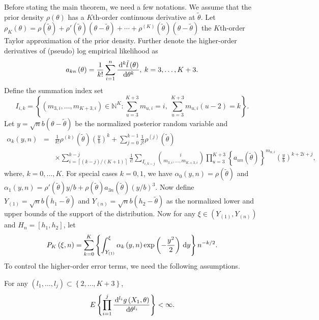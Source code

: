 Before stating the main theorem, we need a few notations. We assume that the
prior density $\rho\left(\theta\right)$ has a $K$th-order continuous derivative
at $\tilde{\theta}$. Let $\rho_{K}\left(\theta\right)=\rho\left(\tilde{\theta}\right)+\rho'\left(\tilde{\theta}\right)\left(\theta-\tilde{\theta}\right)+\cdots+\rho^{\left(K\right)}\left(\tilde{\theta}\right)\left(\theta-\tilde{\theta}\right)$ the $K$th-order  Taylor approximation of the prior density.
Further denote the higher-order derivatives of (pseudo) log empirical
likelihood as 
\[
a_{kn}\left(\theta\right)=\frac{1}{k!}\sum_{i=1}^{n}\frac{\,\mathrm{d}^{k}\tilde{l}\left(\theta\right)}{\,\mathrm{d}\theta^{k}},\: k=3,\ldots,K+3.
\]
 Define the summation index set 
\[
I_{i,k}=\left\{ \left(m_{3,i},\ldots,m_{K+3,i}\right)\in\mathbb{N}^{K}:\sum_{u=3}^{K+3}m_{u,i}=i,\:\sum_{u=3}^{K+3}m_{u,i}\left(u-2\right)=k\right\} .
\]
 Let $y=\sqrt{n}b\left(\theta-\tilde{\theta}\right)$ be the normalized posterior random variable and 
\begin{eqnarray*}
\alpha_{k}\left(y,n\right) & = & \frac{1}{k!}\rho^{\left(k\right)}\left(\tilde{\theta}\right)\left(\frac{y}{b}\right)^{k}+\sum_{j=0}^{k-1}\frac{1}{j!}\rho^{\left(j\right)}\left(\tilde{\theta}\right)\\
 &  & \times\sum_{i=\left\lceil \left(k-j\right)/\left(K+1\right)\right\rceil }^{k-j}\frac{1}{i!}\sum_{I_{i,k-j}}\binom{i}{m_{3,i},\ldots,m_{K+3,i}}\prod_{u=3}^{K+3}\left\{ a_{un}\left(\tilde{\theta}\right)\right\} ^{m_{u,i}}\left(\frac{y}{b}\right)^{k+2i+j},
\end{eqnarray*}
where, $k=0,\ldots,K$. For special cases $k=0,1$, we have $\alpha_{0}\left(y,n\right)=\rho\left(\tilde{\theta}\right)$
and $\alpha_{1}\left(y,n\right)=\rho'\left(\tilde{\theta}\right)y/b+\rho\left(\tilde{\theta}\right)a_{3n}\left(\tilde{\theta}\right)\left(y/b\right)^{3}.$
Now define $Y_{\left(1\right)}=\sqrt{n}b\left(h_{1}-\tilde{\theta}\right)$
and $Y_{\left(n\right)}=\sqrt{n}b\left(h_{2}-\tilde{\theta}\right)$  as  the normalized lower and upper bounds of the support of the  distribution. Now for any $\xi\in\left(Y_{\left(1\right)},Y_{\left(n\right)}\right)$ 
and $H_n=\left[h_{1},h_{2}\right]$, {let }
\[
P_{K}\left(\xi,n\right)=\sum_{k=0}^{K}\left\{ \int_{Y_{\left(1\right)}}^{\xi}\alpha_{k}\left(y,n\right)\exp\left(-\frac{y^{2}}{2}\right)\,\mathrm{d} y\right\} n^{-k/2}.
\]
To control the higher-order error terms, we need the following assumptions.
\begin{assumption}
\label{ass:higher-order-moment-deriv-g}
For any $\left(l_1,\ldots,l_j\right)\subset\left\{2,\ldots,K+3\right\}$,
\[
	E\left\{\prod_{i=1}^j \frac{\,\mathrm{d}^{l_i} g\left(X_1,\theta\right)}{\,\mathrm{d} \theta^{l_i}}\right\} < \infty.
\]
\end{assumption}

